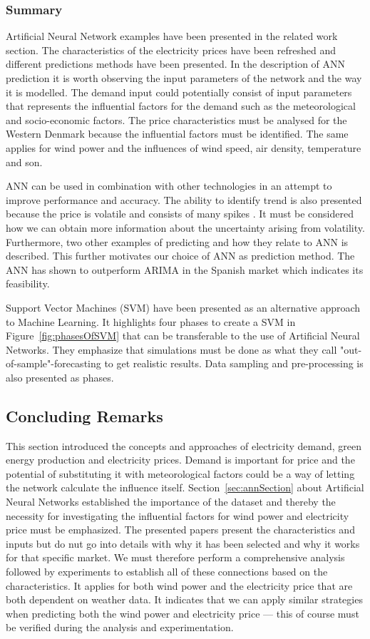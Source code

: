 \subsubsection{Summary}
Artificial Neural Network examples have been presented in the related work section. The characteristics of the electricity prices have been refreshed and different predictions methods have been presented. 
In the description of ANN prediction it is worth observing the input parameters of the network and the way it is modelled. The demand input could potentially consist of input parameters that represents the influential factors for the demand such as the meteorological and socio-economic factors. The price characteristics must be analysed for the Western Denmark because the influential factors must be identified. The same applies for wind power and the influences of wind speed, air density, temperature and son.

ANN can be used in combination with other technologies in an attempt to improve performance and accuracy. The ability to identify trend is also presented because the price is volatile and consists of many spikes \cite{singhal2011electricity}. It must be considered how we can obtain more information about the uncertainty arising from volatility. Furthermore, two other examples of predicting and how they relate to ANN is described. This further motivates our choice of ANN as prediction method. The ANN has shown to outperform ARIMA in the Spanish market which indicates its feasibility. 

Support Vector Machines (SVM) have been presented as an alternative approach to Machine Learning. It highlights four phases to create a SVM in Figure~\ref{fig:phasesOfSVM} that can be transferable to the use of Artificial Neural Networks. They emphasize that simulations must be done as what they call "out-of-sample"-forecasting to get realistic results. Data sampling and pre-processing is also presented as phases.   

\subsection{Concluding Remarks}
This section introduced the concepts and approaches of electricity demand, green energy production and electricity prices. Demand is important for price and the potential of substituting it with meteorological factors could be a way of letting the network calculate the influence itself. Section~\ref{sec:annSection} about Artificial Neural Networks established the importance of the dataset and thereby the necessity for investigating the influential factors for wind power and electricity price must be emphasized. The presented papers present the characteristics and inputs but do nut go into details with why it has been selected and why it works for that specific market. We must therefore perform a comprehensive analysis followed by experiments to establish all of these connections based on the characteristics. It applies for both wind power and the electricity price that are both dependent on weather data. It indicates that we can apply similar strategies when predicting both the wind power and electricity price --- this of course must be verified during the analysis and experimentation.